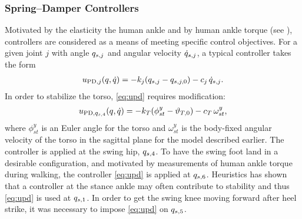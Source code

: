 \subsubsection{Spring--Damper Controllers}

Motivated by the elasticity the human ankle and by human ankle torque (see
\cite{Au2009}), \PDx controllers are considered as a means of meeting specific
control objectives.
%
For a given joint $j$ with angle $q_{s,j}$ and angular velocity $\dot{q}_{s,j}$, a
typical \PDx controller takes the form
\begin{align}
  \label{eq:upd}
  u_{\mathrm{PD}, j}(q, \dot{q}) = -k_{j} (q_{s,j} - q_{s,j,0}) - c_{j} \,
  \dot{q}_{s,j}.
\end{align}
%
In order to stabilize the torso, \eqref{eq:upd} requires modification:
\begin{align*}
  u_{\mathrm{PD}, q_{s,4}}(q, \dot{q}) = -k_{T} (\phi_{st}^{y} - \vartheta_{T,0}) - c_{T} \,
  \omega_{st}^{y},
\end{align*}
where $\phi_{st}^{y}$ is an Euler angle for the torso and $\omega_{st}^{y}$ is
the body-fixed angular velocity of the torso in the sagittal plane for the model
described earlier.
%
The controller is applied at the swing hip, $q_{s,4}$.
%
To have the swing foot land in a desirable configuration, and motivated by
measurements of human ankle torque during walking, the \PDx controller
\eqref{eq:upd} is applied at $q_{s,6}$.
%
Heuristics has shown that a \PDx controller at the stance ankle may often
contribute to stability and thus \eqref{eq:upd} is used at $q_{s,1}$.
%
In order to get the swing knee moving forward after heel strike, it was
necessary to impose \eqref{eq:upd} on $q_{s,5}$.

